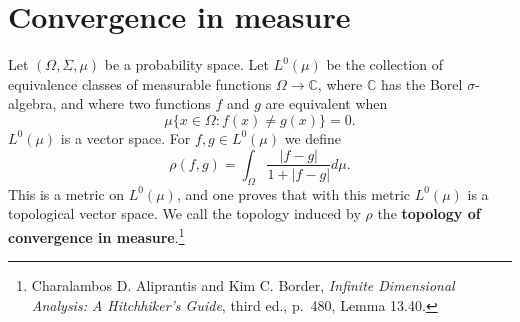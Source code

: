 \documentclass{article}
\theoremstyle{definition}
\theoremstyle{definition}
\begin{document}
\section{Convergence in measure}
Let $(\Omega,\Sigma,\mu)$ be a probability space.
Let $L^0(\mu)$ be the collection of equivalence classes of
measurable functions 
$\Omega \to \mathbb{C}$, where $\mathbb{C}$ has the Borel $\sigma$-algebra, and where two functions $f$ and $g$ are equivalent when
\[
\mu\{x \in \Omega: f(x) \neq g(x)\} = 0.
\]
$L^0(\mu)$ is a vector space. 
For $f,g \in L^0(\mu)$ we define
\[
\rho(f,g) = \int_\Omega \frac{|f-g|}{1+|f-g|}  d\mu.
\]
This is a metric on $L^0(\mu)$, and one proves that with this metric $L^0(\mu)$ is a topological vector space. We call the topology
induced by $\rho$ the \textbf{topology of convergence in measure}.\footnote{Charalambos D. 
Aliprantis and Kim C. Border, {\em Infinite Dimensional Analysis: A Hitchhiker's Guide}, third ed., p.~480,
Lemma 13.40.} 
\end{document}

